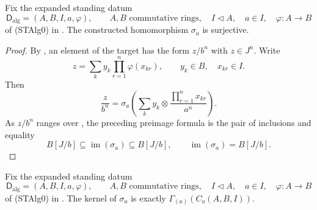 \begin{lemma}
  \label{lemma:nagata-strict-chart-map-surjective}
  \lean{}

  Fix the expanded standing datum
  \[
    \mathsf D_{\mathrm{alg}}=(A,B,I,a,\varphi),\qquad
    A,B\text{ commutative rings},\quad
    I\triangleleft A,\quad a\in I,\quad
    \varphi\colon A\to B
  \]
  of (STAlg0) in
  .
  The constructed homomorphism $\sigma_a$ is surjective.
\end{lemma}

\begin{proof}
  By , an element of the target has
  the form $z/b^n$ with $z\in J^n$.  Write
  \[
    z=\sum_k y_k\prod_{r=1}^n\varphi(x_{kr}),
    \qquad y_k\in B,\quad x_{kr}\in I.
  \]
  Then
  \[
    \frac z{b^n}
      =\sigma_a\left(
        \sum_k y_k\otimes
          \frac{\prod_{r=1}^nx_{kr}}{a^n}\right).
  \]
  As $z/b^n$ ranges over
  , the preceding preimage formula
  is the pair of inclusions and equality
  \[
    B[J/b]\subseteq\operatorname{im}(\sigma_a)
      \subseteq B[J/b],
    \qquad
    \operatorname{im}(\sigma_a)=B[J/b].
  \]
\end{proof}

\begin{lemma}
  \label{lemma:nagata-strict-chart-map-kernel}
  \lean{}

  Fix the expanded standing datum
  \[
    \mathsf D_{\mathrm{alg}}=(A,B,I,a,\varphi),\qquad
    A,B\text{ commutative rings},\quad
    I\triangleleft A,\quad a\in I,\quad
    \varphi\colon A\to B
  \]
  of (STAlg0) in
  .
  The kernel of $\sigma_a$ is exactly
  $\Gamma_{(a)}(C_a(A,B,I))$.
\end{lemma}

